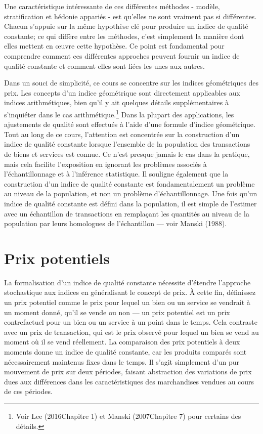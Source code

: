 \documentclass[
]{article}
\begin{document}
Une caractéristique intéressante de ces différentes méthodes - modèle, stratification et hédonie appariés - est qu'elles ne sont vraiment pas si différentes. Chacun s'appuie sur la même hypothèse clé pour produire un indice de qualité constante; ce qui diffère entre les méthodes, c'est simplement la manière dont elles mettent en œuvre cette hypothèse. Ce point est fondamental pour comprendre comment ces différentes approches peuvent fournir un indice de qualité constante et comment elles sont liées les unes aux autres.

Dans un souci de simplicité, ce cours se concentre sur les indices géométriques des prix. Les concepts d'un indice géométrique sont directement applicables aux indices arithmétiques, bien qu'il y ait quelques détails supplémentaires à s'inquiéter dans le cas arithmétique.\footnote{Voir Lee (2016Chapitre 1) et Manski (2007Chapitre 7) pour certains des détails.} Dans la plupart des applications, les ajustements de qualité sont effectués à l'aide d'une formule d'indice géométrique. Tout au long de ce cours, l'attention est concentrée sur la construction d'un indice de qualité constante lorsque l'ensemble de la population des transactions de biens et services est connue. Ce n'est presque jamais le cas dans la pratique, mais cela facilite l'exposition en ignorant les problèmes associés à l'échantillonnage et à l'inférence statistique. Il souligne également que la construction d'un indice de qualité constante est fondamentalement un problème au niveau de la population, et non un problème d'échantillonnage. Une fois qu'un indice de qualité constante est défini dans la population, il est simple de l'estimer avec un échantillon de transactions en remplaçant les quantités au niveau de la population par leurs homologues de l'échantillon --- voir Manski (1988).

\hypertarget{prix-potentiels}{%
\section{Prix potentiels}\label{prix-potentiels}}

La formalisation d'un indice de qualité constante nécessite d'étendre l'approche stochastique aux indices en généralisant le concept de prix. À cette fin, définissez un prix potentiel comme le prix pour lequel un bien ou un service se vendrait à un moment donné, qu'il se vende ou non --- un prix potentiel est un prix contrefactuel pour un bien ou un service à un point dans le temps. Cela contraste avec un prix de transaction, qui est le prix observé pour lequel un bien se vend au moment où il se vend réellement. La comparaison des prix potentiels à deux moments donne un indice de qualité constante, car les produits comparés sont nécessairement maintenus fixes dans le temps. Il s'agit simplement d'un pur mouvement de prix sur deux périodes, faisant abstraction des variations de prix dues aux différences dans les caractéristiques des marchandises vendues au cours de ces périodes.
\end{document}
